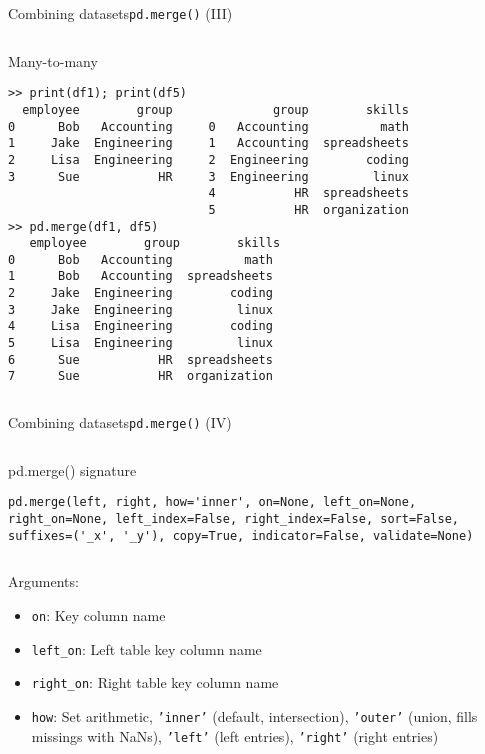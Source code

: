 \documentclass[10pt,compress]{beamer} %
\begin{document}
\begin{frame}[fragile]{Combining datasets}{\texttt{pd.merge()} (III)}
	\scriptsize{
	\begin{columns}
		\begin{exampleblock}{\footnotesize{Many-to-many}}
		\vspace{-0.2cm} 
		\begin{lstlisting}
>> print(df1); print(df5)
  employee        group              group        skills
0      Bob   Accounting     0   Accounting          math
1     Jake  Engineering     1   Accounting  spreadsheets
2     Lisa  Engineering     2  Engineering        coding
3      Sue           HR     3  Engineering         linux
                            4           HR  spreadsheets
                            5           HR  organization
>> pd.merge(df1, df5)
   employee        group        skills
0      Bob   Accounting          math
1      Bob   Accounting  spreadsheets
2     Jake  Engineering        coding
3     Jake  Engineering         linux
4     Lisa  Engineering        coding
5     Lisa  Engineering         linux
6      Sue           HR  spreadsheets
7      Sue           HR  organization
\end{lstlisting}
		\vspace{-0.2cm} 
		\end{exampleblock}
	\end{columns}
	}
\end{frame}

\begin{frame}[fragile]{Combining datasets}{\texttt{pd.merge()} (IV)}
	\begin{columns}
    \column{\textwidth}
	\begin{block}{pd.merge() signature}
		\vspace{-0.2cm} 
		\begin{lstlisting}
pd.merge(left, right, how='inner', on=None, left_on=None, right_on=None, left_index=False, right_index=False, sort=False, suffixes=('_x', '_y'), copy=True, indicator=False, validate=None)
\end{lstlisting}
		\vspace{-0.2cm} 
		\end{block}
	\end{columns}
	
	\bigskip

	Arguments:
	\begin{itemize}
		\item \texttt{on}: Key column name
		\item \texttt{left\_on}: Left table key column name
		\item \texttt{right\_on}: Right table key column name
		\item \texttt{how}: Set arithmetic, \texttt{'inner'} (default, intersection), \texttt{'outer'} (union, fills missings with NaNs), \texttt{'left'} (left entries), \texttt{'right'} (right entries)
	\end{itemize}

\end{frame}
\end{document}
